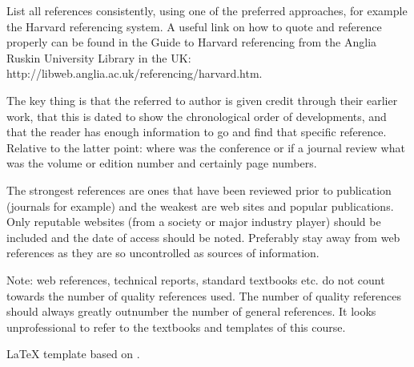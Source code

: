 \documentclass{article}
\begin{document}



List all references consistently, using one of the preferred approaches, for example the Harvard referencing system. A useful link on how to quote and reference properly can be found in the Guide to Harvard referencing from the Anglia Ruskin University Library in the UK: http://libweb.anglia.ac.uk/referencing/harvard.htm.

The key thing is that the referred to author is given credit through their earlier work, that this is dated to show the chronological order of developments, and that the reader has enough information to go and find that specific reference. Relative to the latter point: where was the conference or if a journal review what was the volume or edition number and certainly page numbers.

The strongest references are ones that have been reviewed prior to publication (journals for example) and the weakest are web sites and popular publications. Only reputable websites (from a society or major industry player) should be included and the date of access should be noted. Preferably stay away from web references as they are so uncontrolled as sources of information.

Note: web references, technical reports, standard textbooks etc. do not count towards the number of quality references used. The number of quality references should always greatly outnumber the number of general references. It looks unprofessional to refer to the textbooks and templates of this course.


\LaTeX {} template based on \cite{template}.
\end{document}
